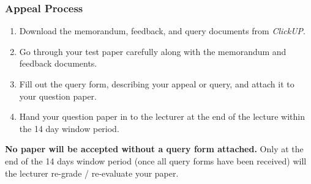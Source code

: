         \subsubsection{Appeal Process}
            \begin{enumerate}
                \item Download the memorandum, feedback, and query documents
                    from {\it ClickUP}.
                \item Go through your test paper carefully along with the
                    memorandum and feedback documents.
                \item Fill out the query form, describing your appeal or query,
                    and attach it to your question paper.
                \item Hand your question paper in to the lecturer at the end of
                    the lecture within the 14 day window period.
            \end{enumerate}

            \textbf{No paper will be accepted without a query form attached.}
            Only at the end of the 14 days window period (once all query forms
            have been received) will the lecturer re-grade / re-evaluate your
            paper.
